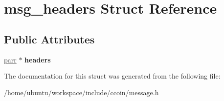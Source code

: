 \hypertarget{structmsg__headers}{\section{msg\-\_\-headers Struct Reference}
\label{structmsg__headers}
}
\subsection*{Public Attributes}
\begin{DoxyCompactItemize}
\item 
\hypertarget{structmsg__headers_a3126442c9eb4c2822334fb038aa02816}{\hyperlink{structparr}{parr} $\ast$ {\bfseries headers}}\label{structmsg__headers_a3126442c9eb4c2822334fb038aa02816}

\end{DoxyCompactItemize}


The documentation for this struct was generated from the following file\-:\begin{DoxyCompactItemize}
\item 
/home/ubuntu/workspace/include/ccoin/message.\-h\end{DoxyCompactItemize}
